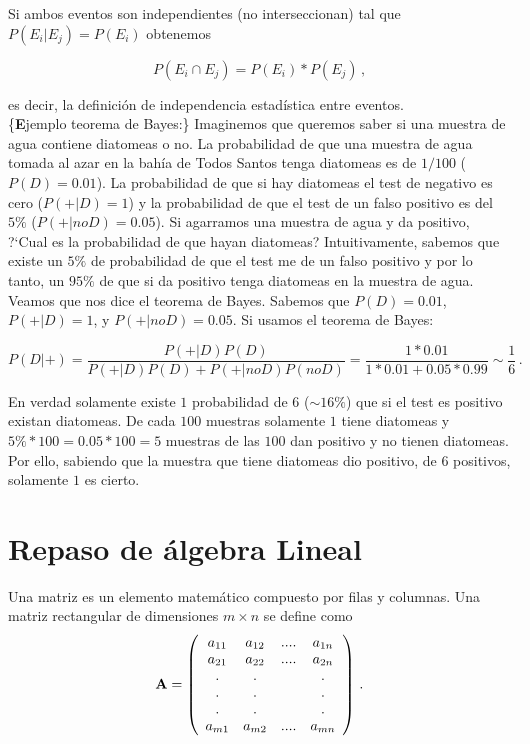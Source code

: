 \documentclass[
]{agujournal2019}
\begin{document}
Si ambos eventos son independientes (no interseccionan) tal que
\(P(E_i|E_j)=P(E_i)\) obtenemos

\[P(E_i\cap E_j)=P(E_i)*P(E_j)\,,\]

es decir, la definición de independencia estadística entre eventos.\\

\{\textbf Ejemplo teorema de Bayes:\} Imaginemos que queremos saber si
una muestra de agua contiene diatomeas o no. La probabilidad de que una
muestra de agua tomada al azar en la bahía de Todos Santos tenga
diatomeas es de \(1/100\) (\(P(D)=0.01\)). La probabilidad de que si hay
diatomeas el test de negativo es cero (\(P(+|D)=1\)) y la probabilidad
de que el test de un falso positivo es del \(5\%\) (\(P(+|noD)=0.05\)).
Si agarramos una muestra de agua y da positivo, ?{}`Cual es la
probabilidad de que hayan diatomeas? Intuitivamente, sabemos que existe
un \(5\%\) de probabilidad de que el test me de un falso positivo y por
lo tanto, un \(95\%\) de que si da positivo tenga diatomeas en la
muestra de agua. Veamos que nos dice el teorema de Bayes. Sabemos que
\(P(D)=0.01\), \(P(+|D)=1\), y \(P(+|noD)=0.05\). Si usamos el teorema
de Bayes:

\[ P(D|+)=\frac{P(+|D)P(D)}{P(+|D)P(D) + P(+|noD)P(noD)}=
          \frac{1*0.01}{1*0.01+0.05*0.99}\sim\frac{1}{6}\,.\]

En verdad solamente existe \(1\) probabilidad de \(6\) (\(\sim16\%\))
que si el test es positivo existan diatomeas. De cada \(100\) muestras
solamente \(1\) tiene diatomeas y \(5\%*100=0.05*100=5\) muestras de las
\(100\) dan positivo y no tienen diatomeas. Por ello, sabiendo que la
muestra que tiene diatomeas dio positivo, de \(6\) positivos, solamente
\(1\) es cierto.




\section{Repaso de álgebra Lineal}\label{repaso-de-uxe1lgebra-lineal}

Una matriz es un elemento matemático compuesto por filas y columnas. Una
matriz rectangular de dimensiones \(m\times n\) se define como
\[{\textbf A}=\left(\begin{array}{cccc}
  a_{11} & a_{12} & .... & a_{1n}\\
  a_{21} & a_{22} & .... & a_{2n}\\
    .    &   .    &      &   . \\
    .    &   .    &      &   . \\
    .    &   .    &      &   . \\
  a_{m1} & a_{m2} & .... & a_{mn}\\
\end{array}
  \right)
\,.\]
\end{document}
